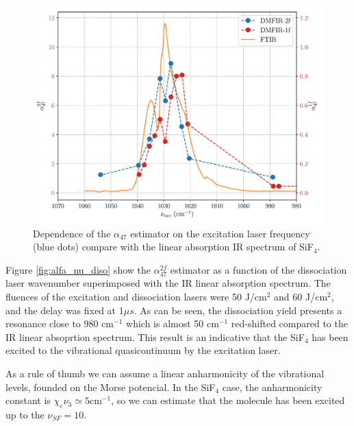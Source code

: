 \documentclass[global,twocolumn]{svjour}
\begin{document}
\begin{figure}[h]
	\centering
	\includegraphics[width = 1\linewidth]{figures/alfa_47_nu_bombeo.pdf}
	\caption{\label{fig:alfa_nu_bombeo} Dependence of the $\alpha_{47}$ estimator on the excitation laser frequency (blue dots) compare with the linear absorption IR spectrum of SiF$_{4}$.}
\end{figure}

Figure \ref{fig:alfa_nu_diso} show the $\alpha_{47}^{2f}$ estimator as a function of the dissociation laser wavenumber superimposed with the IR linear absorption spectrum. The fluences of the excitation and dissociation lasers were 50 J/cm$^{2}$ and 60 J/cm$^{2}$, and the delay was fixed at 1$\mu s$. As can be seen, the dissociation yield presents a resonance close to 980 cm$^{-1}$ which is almost 50 cm$^{-1}$ red-shifted compared to the IR linear absoprtion spectrum. This result is an indicative that the SiF$_{4}$ has been excited to the vibrational quasicontinuum by the excitation laser.  

As a rule of thumb we can assume a linear anharmonicity of the vibrational levels, founded on the Morse potencial. In the SiF$_{4}$ case, the anharmonicity constant is $\chi_{e}\nu_{3} \simeq 5 \text{cm}^{-1}$, so we can estimate that the molecule has been excited up to the $\nu_{SF} = 10$. 
\end{document}
